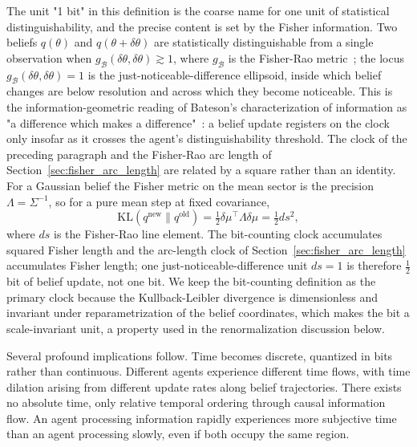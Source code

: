 \documentclass[11pt]{article}
\begin{document}
The unit "1 bit" in this definition is the coarse name for one unit of statistical distinguishability, and the precise content is set by the Fisher information. Two beliefs $q(\theta)$ and $q(\theta + \delta\theta)$ are statistically distinguishable from a single observation when $g_{\mathcal{B}}(\delta\theta, \delta\theta) \gtrsim 1$, where $g_{\mathcal{B}}$ is the Fisher-Rao metric~\cite{CoverThomas2006, AmariNagaoka2000}; the locus $g_{\mathcal{B}}(\delta\theta, \delta\theta) = 1$ is the just-noticeable-difference ellipsoid, inside which belief changes are below resolution and across which they become noticeable. This is the information-geometric reading of Bateson's characterization of information as "a difference which makes a difference"~\cite{Bateson1972}: a belief update registers on the clock only insofar as it crosses the agent's distinguishability threshold. The clock of the preceding paragraph and the Fisher-Rao arc length of Section~\ref{sec:fisher_arc_length} are related by a square rather than an identity. For a Gaussian belief the Fisher metric on the mean sector is the precision $\Lambda = \Sigma^{-1}$, so for a pure mean step at fixed covariance,
\begin{equation}
\mathrm{KL}(q^{\text{new}} \| q^{\text{old}}) = \tfrac{1}{2}\delta\mu^\top \Lambda \delta\mu = \tfrac{1}{2}ds^2,
\label{eq:kl_arclength}
\end{equation}
where $ds$ is the Fisher-Rao line element. The bit-counting clock accumulates squared Fisher length and the arc-length clock of Section~\ref{sec:fisher_arc_length} accumulates Fisher length; one just-noticeable-difference unit $ds = 1$ is therefore $\tfrac{1}{2}$ bit of belief update, not one bit. We keep the bit-counting definition as the primary clock because the Kullback-Leibler divergence is dimensionless and invariant under reparametrization of the belief coordinates, which makes the bit a scale-invariant unit, a property used in the renormalization discussion below.

Several profound implications follow. Time becomes discrete, quantized in bits rather than continuous. Different agents experience different time flows, with time dilation arising from different update rates along belief trajectories. There exists no absolute time, only relative temporal ordering through causal information flow. An agent processing information rapidly experiences more subjective time than an agent processing slowly, even if both occupy the same region.
\end{document}
